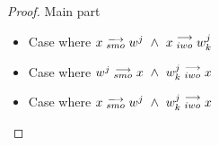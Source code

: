 \begin{proof}{Main part}
\begin{itemize}
\begin{itemize}
                            \item Case where $x\stackrel{\longrightarrow}{_{smo}}w^j \ \wedge \ x\stackrel{\longrightarrow}{_{iwo}}w_k^j$
                                


                            \item Case where $w^j\stackrel{\longrightarrow}{_{smo}}x \ \wedge \ w_k^j\stackrel{\longrightarrow}{_{iwo}}x$


                            \item Case where $x\stackrel{\longrightarrow}{_{smo}}w^j \ \wedge \ w_k^j\stackrel{\longrightarrow}{_{iwo}}x$


\end{itemize}
\end{itemize}
\end{proof}

